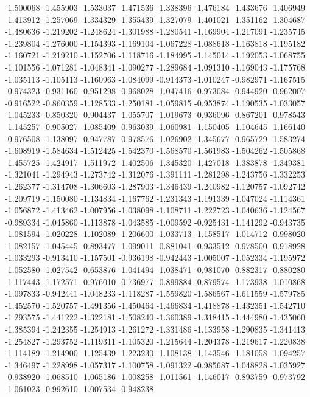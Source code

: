 -1.500068
-1.455903
-1.533037
-1.471536
-1.338396
-1.476184
-1.433676
-1.406949
-1.413912
-1.257069
-1.334329
-1.355439
-1.327079
-1.401021
-1.351162
-1.304687
-1.480636
-1.219202
-1.248624
-1.301988
-1.280541
-1.169904
-1.217091
-1.235745
-1.239804
-1.276000
-1.154393
-1.169104
-1.067228
-1.088618
-1.163818
-1.195182
-1.160721
-1.219210
-1.152706
-1.118716
-1.184995
-1.145014
-1.192053
-1.068755
-1.101556
-1.071281
-1.048341
-1.090277
-1.289684
-1.091310
-1.169043
-1.175768
-1.035113
-1.105113
-1.160963
-1.084099
-0.914373
-1.010247
-0.982971
-1.167515
-0.974323
-0.931160
-0.951298
-0.968028
-1.047416
-0.973084
-0.944920
-0.962007
-0.916522
-0.860359
-1.128533
-1.250181
-1.059815
-0.953874
-1.190535
-1.033057
-1.045233
-0.850320
-0.904437
-1.055707
-1.019673
-0.936096
-0.867201
-0.978543
-1.145257
-0.905027
-1.085409
-0.963039
-1.060981
-1.150405
-1.104645
-1.166140
-0.976508
-1.138097
-0.947787
-0.978576
-1.026902
-1.345677
-0.965729
-1.583274
-1.608919
-1.584634
-1.512425
-1.542370
-1.568570
-1.561983
-1.504262
-1.505868
-1.455725
-1.424917
-1.511972
-1.402506
-1.345320
-1.427018
-1.383878
-1.349381
-1.321041
-1.294943
-1.273742
-1.312076
-1.391111
-1.281298
-1.243756
-1.332253
-1.262377
-1.314708
-1.306603
-1.287903
-1.346439
-1.240982
-1.120757
-1.092742
-1.209719
-1.150080
-1.134834
-1.167762
-1.231343
-1.191339
-1.047024
-1.114361
-1.056872
-1.413462
-1.007956
-1.038098
-1.108711
-1.222723
-1.040636
-1.124567
-0.989334
-1.045860
-1.113878
-1.043585
-1.009592
-0.925431
-1.141292
-0.943735
-1.081594
-1.020228
-1.102089
-1.206600
-1.033713
-1.158517
-1.014712
-0.998020
-1.082157
-1.045445
-0.893477
-1.099011
-0.881041
-0.933512
-0.978500
-0.918928
-1.033293
-0.913410
-1.157501
-0.936198
-0.942443
-1.005007
-1.052334
-1.195972
-1.052580
-1.027542
-0.653876
-1.041494
-1.038471
-0.981070
-0.882317
-0.880280
-1.117443
-1.172571
-0.976010
-0.736977
-0.899884
-0.879574
-1.173938
-1.010868
-1.097833
-0.942441
-1.048233
-1.118287
-1.559820
-1.586567
-1.611559
-1.579785
-1.452570
-1.520757
-1.491356
-1.450464
-1.466834
-1.418878
-1.432351
-1.542710
-1.293575
-1.441222
-1.322181
-1.508240
-1.360389
-1.318415
-1.444980
-1.435060
-1.385394
-1.242355
-1.254913
-1.261272
-1.331486
-1.133958
-1.290835
-1.341413
-1.254827
-1.293752
-1.119311
-1.105320
-1.215644
-1.204378
-1.219617
-1.220838
-1.114189
-1.214900
-1.125439
-1.223230
-1.108138
-1.143546
-1.181058
-1.094257
-1.346497
-1.228998
-1.057317
-1.100758
-1.091322
-0.985687
-1.048828
-1.035927
-0.938920
-1.068510
-1.065186
-1.008258
-1.011561
-1.146017
-0.893759
-0.973792
-1.061023
-0.992610
-1.007534
-0.948238
